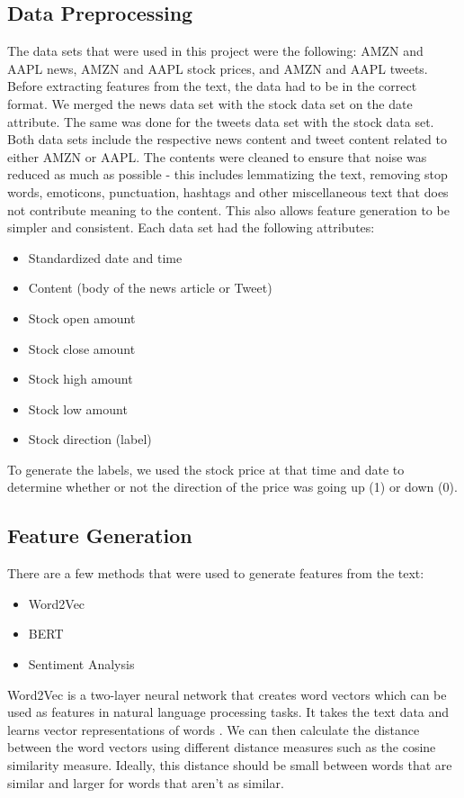 \documentclass[conference]{IEEEtran}
\begin{document}
\subsection{Data Preprocessing}\label{AA}
The data sets that were used in this project were the following: AMZN and AAPL news, AMZN and AAPL stock prices, and AMZN and AAPL tweets. Before extracting features from the text, the data had to be in the correct format. We merged the news data set with the stock data set on the date attribute. The same was done for the tweets data set with the stock data set. Both data sets include the respective news content and tweet content related to either AMZN or AAPL. The contents were cleaned to ensure that noise was reduced as much as possible - this includes lemmatizing the text, removing stop words, emoticons, punctuation, hashtags and other miscellaneous text that does not contribute meaning to the content. This also allows feature generation to be simpler and consistent. Each data set had the following attributes:
\begin{itemize}
    \item Standardized date and time
    \item Content (body of the news article or Tweet)
    \item Stock open amount
    \item Stock close amount
    \item Stock high amount
    \item Stock low amount
    \item Stock direction (label)
\end{itemize}
To generate the labels, we used the stock price at that time and date to determine whether or not the direction of the price was going up (1) or down (0).

\subsection{Feature Generation}
There are a few methods that were used to generate features from the text:
\begin{itemize}
    \item Word2Vec
    \item BERT
    \item Sentiment Analysis
\end{itemize}

Word2Vec is a two-layer neural network that creates word vectors which can be used as features in natural language processing tasks. It takes the text data and learns vector representations of words \cite{b3}. We can then calculate the distance between the word vectors using different distance measures such as the cosine similarity measure. Ideally, this distance should be small between words that are similar and larger for words that aren't as similar.
\end{document}
